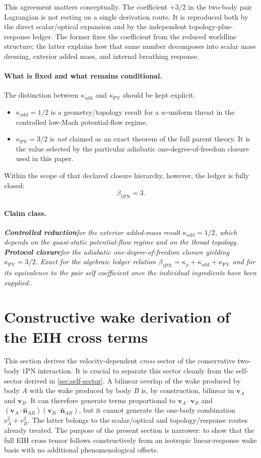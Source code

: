 \documentclass[11pt]{article}
\newcommand{\vct}{\mathbf v}
\newcommand{\kadd}{\kappa_{\mathrm{add}}}
\newcommand{\kPV}{\kappa_{\mathrm{PV}}}
\newcommand{\krho}{\kappa_{\rho}}
\newcommand{\betaPN}{\beta_{\mathrm{1PN}}}
\newcommand{\Controlled}{\textbf{Controlled reduction}}
\newcommand{\Protocol}{\textbf{Protocol closure}}
\newcommand{\claimclass}[1]{\paragraph{Claim class.}\emph{#1.}}
\begin{document}
This agreement matters conceptually. The coefficient \(+3/2\) in the two-body pair
Lagrangian is not resting on a single derivation route. It is reproduced both by the
direct scalar/optical expansion and by the independent topology-plus-response ledger. The
former fixes the coefficient from the reduced worldline structure; the latter explains how
that same number decomposes into scalar mass dressing, exterior added mass, and internal
breathing response.

\paragraph{What is fixed and what remains conditional.}
The distinction between \(\kadd\) and \(\kPV\) should be kept explicit.

\begin{itemize}[leftmargin=1.5em]
  \item \(\kadd=1/2\) is a geometry/topology result for a \(w\)-uniform throat in the
  controlled low-Mach potential-flow regime.
  \item \(\kPV=3/2\) is \emph{not} claimed as an exact theorem of the full parent theory.
  It is the value selected by the particular adiabatic one-degree-of-freedom closure used
  in this paper.
\end{itemize}

Within the scope of that declared closure hierarchy, however, the ledger is fully closed:
\begin{equation}
\betaPN=3.
\end{equation}

\claimclass{\Controlled for the exterior added-mass result
\(\kadd=1/2\), which depends on the quasi-static potential-flow regime and on the throat
topology. \Protocol for the adiabatic one-degree-of-freedom closure yielding
\(\kPV=3/2\). Exact for the algebraic ledger relation
\(\betaPN=\krho+\kadd+\kPV\) and for its equivalence to the pair self coefficient once the
individual ingredients have been supplied.}


\section{Constructive wake derivation of the EIH cross terms}
\label{sec:wake}

This section derives the velocity-dependent \emph{cross} sector of the conservative
two-body \(1\)PN interaction. It is crucial to separate this sector cleanly from the
self-sector derived in \cref{sec:self-sector}. A bilinear overlap of the wake produced by
body \(A\) with the wake produced by body \(B\) is, by construction, bilinear in
\(\vct_A\) and \(\vct_B\). It can therefore generate terms proportional to
\(\vct_A\!\cdot\!\vct_B\) and
\((\vct_A\!\cdot\!\hat{\mathbf n}_{AB})(\vct_B\!\cdot\!\hat{\mathbf n}_{AB})\), but it
cannot generate the one-body combination \(v_A^2+v_B^2\). The latter belongs to the
scalar/optical and topology/response routes already treated. The purpose of the present
section is narrower: to show that the full EIH cross tensor follows constructively from an
isotropic linear-response wake basis with no additional phenomenological offsets.
\end{document}
